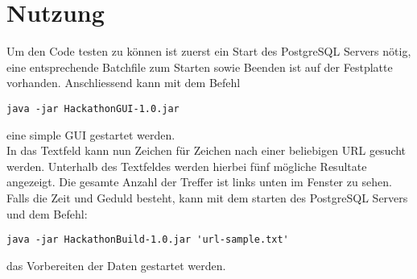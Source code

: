 \documentclass[11pt]{article} %
\begin{document}
\section{Nutzung}
Um den Code testen zu können ist zuerst ein Start des PostgreSQL Servers nötig, eine entsprechende Batchfile zum Starten sowie Beenden ist auf der Festplatte vorhanden. Anschliessend kann mit dem Befehl \begin{lstlisting}
java -jar HackathonGUI-1.0.jar
\end{lstlisting} eine simple GUI gestartet werden.\\
In das Textfeld kann nun Zeichen für Zeichen nach einer beliebigen URL gesucht werden. Unterhalb des Textfeldes werden hierbei fünf mögliche Resultate angezeigt. Die gesamte Anzahl der Treffer ist links unten im Fenster zu sehen.\\
Falls die Zeit und Geduld besteht, kann mit dem starten des PostgreSQL Servers und dem Befehl:
\begin{lstlisting}
java -jar HackathonBuild-1.0.jar 'url-sample.txt'
\end{lstlisting}
das Vorbereiten der Daten gestartet werden.
\end{document}
